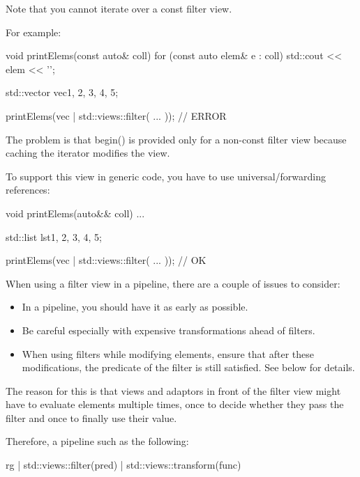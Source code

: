 
Note that you cannot iterate over a const filter view.

For example:

\begin{cpp}
void printElems(const auto& coll) {
	for (const auto elem& e : coll) {
		std::cout << elem << '\n';
	}
}

std::vector vec{1, 2, 3, 4, 5};

printElems(vec | std::views::filter( ... )); // ERROR
\end{cpp}

The problem is that begin() is provided only for a non-const filter view because caching the iterator modifies the view.

To support this view in generic code, you have to use universal/forwarding references:

\begin{cpp}
void printElems(auto&& coll) {
	...
}

std::list lst{1, 2, 3, 4, 5};

printElems(vec | std::views::filter( ... )); // OK
\end{cpp}


When using a filter view in a pipeline, there are a couple of issues to consider:

\begin{itemize}
\item
In a pipeline, you should have it as early as possible.

\item
Be careful especially with expensive transformations ahead of filters.

\item
When using filters while modifying elements, ensure that after these modifications, the predicate of the filter is still satisfied. See below for details.
\end{itemize}

The reason for this is that views and adaptors in front of the filter view might have to evaluate elements multiple times, once to decide whether they pass the filter and once to finally use their value.

Therefore, a pipeline such as the following:

\begin{cpp}
rg | std::views::filter(pred) | std::views::transform(func)
\end{cpp}

